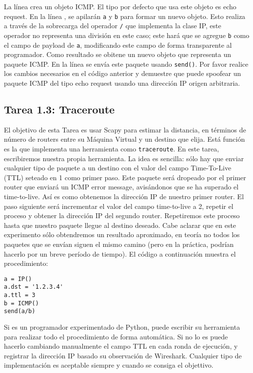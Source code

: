 La línea  crea un objeto ICMP. El tipo por defecto que usa este objeto es echo request. En la línea , se apilarán \texttt{a} y \texttt{b} para formar un nuevo objeto. Esto realiza a través de la sobrecarga del operador \texttt{/} que implementa la clase IP, este operador no representa una división en este caso; este hará que se agregue  \texttt{b} como el campo de payload de \texttt{a}, modificando este campo de forma transparente al programador. Como resultado se obitene un nuevo objeto que representa un paquete ICMP. En la línea  se envía este paquete usando \texttt{send()}. Por favor realice los cambios necesarios en el código anterior y demuestre que puede spoofear un paquete ICMP del tipo echo request usando una dirección IP origen arbitraria.


\subsection{Tarea 1.3: Traceroute} 

El objetivo de esta Tarea es usar Scapy para estimar la distancia, en términos de número de routers entre su Máquina Virtual y un destino que elija. Está función es la que implementa una herramienta como \texttt{traceroute}.
En este tarea, escribiremos nuestra propia herramienta. La idea es sencilla: sólo hay que enviar cualquier tipo de paquete a un destino con el valor del campo Time-To-Live (TTL) seteado en 1 como primer paso. Este paquete será dropeado por el primer router que enviará un 
ICMP error message, avisándonos que se ha superado el time-to-live. Así es como obtenemos la dirección IP de nuestro primer router. El paso siguiente será incrementar el valor del campo time-to-live a 2, repetir el proceso y obtener la dirección IP del segundo router. Repetiremos este proceso hasta que nuestro paquete llegue al destino deseado. Cabe aclarar que en este experimento sólo obtendremos un resultado aproximado, en teoría no todos los paquetes que se envían siguen el mismo camino (pero en la práctica, podrían hacerlo por un breve período de tiempo). El código a continuación muestra el procedimiento:


\begin{lstlisting}
a = IP()
a.dst = '1.2.3.4'
a.ttl = 3
b = ICMP()
send(a/b)
\end{lstlisting}

Si es un programador experimentado de Python, puede escribir su herramienta
para realizar todo el procedimiento de forma automática. Si no lo es puede hacerlo cambiando manualmente el campo TTL en cada ronda de ejecución, y registrar la dirección IP basado su observación de Wireshark. Cualquier tipo de implementación es aceptable siempre y cuando se consiga el objettivo.


